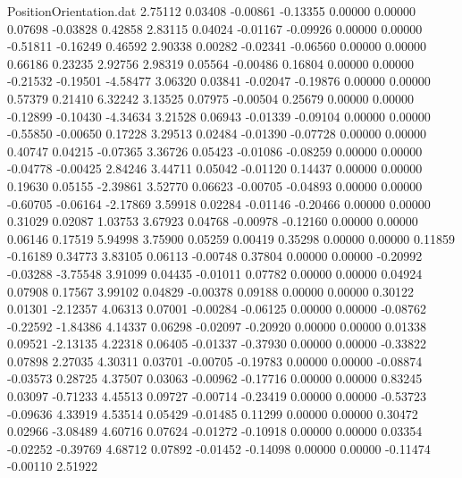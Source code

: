 \begin{filecontents}{PositionOrientation.dat}
   2.75112    0.03408   -0.00861    -0.13355    0.00000    0.00000    0.07698   -0.03828    0.42858
   2.83115    0.04024   -0.01167    -0.09926    0.00000    0.00000   -0.51811   -0.16249    0.46592
   2.90338    0.00282   -0.02341    -0.06560    0.00000    0.00000    0.66186    0.23235    2.92756
   2.98319    0.05564   -0.00486     0.16804    0.00000    0.00000   -0.21532   -0.19501   -4.58477
   3.06320    0.03841   -0.02047    -0.19876    0.00000    0.00000    0.57379    0.21410    6.32242
   3.13525    0.07975   -0.00504     0.25679    0.00000    0.00000   -0.12899   -0.10430   -4.34634
   3.21528    0.06943   -0.01339    -0.09104    0.00000    0.00000   -0.55850   -0.00650    0.17228
   3.29513    0.02484   -0.01390    -0.07728    0.00000    0.00000    0.40747    0.04215   -0.07365
   3.36726    0.05423   -0.01086    -0.08259    0.00000    0.00000   -0.04778   -0.00425    2.84246
   3.44711    0.05042   -0.01120     0.14437    0.00000    0.00000    0.19630    0.05155   -2.39861
   3.52770    0.06623   -0.00705    -0.04893    0.00000    0.00000   -0.60705   -0.06164   -2.17869
   3.59918    0.02284   -0.01146    -0.20466    0.00000    0.00000    0.31029    0.02087    1.03753
   3.67923    0.04768   -0.00978    -0.12160    0.00000    0.00000    0.06146    0.17519    5.94998
   3.75900    0.05259    0.00419     0.35298    0.00000    0.00000    0.11859   -0.16189    0.34773
   3.83105    0.06113   -0.00748     0.37804    0.00000    0.00000   -0.20992   -0.03288   -3.75548
   3.91099    0.04435   -0.01011     0.07782    0.00000    0.00000    0.04924    0.07908    0.17567
   3.99102    0.04829   -0.00378     0.09188    0.00000    0.00000    0.30122    0.01301   -2.12357
   4.06313    0.07001   -0.00284    -0.06125    0.00000    0.00000   -0.08762   -0.22592   -1.84386
   4.14337    0.06298   -0.02097    -0.20920    0.00000    0.00000    0.01338    0.09521   -2.13135
   4.22318    0.06405   -0.01337    -0.37930    0.00000    0.00000   -0.33822    0.07898    2.27035
   4.30311    0.03701   -0.00705    -0.19783    0.00000    0.00000   -0.08874   -0.03573    0.28725
   4.37507    0.03063   -0.00962    -0.17716    0.00000    0.00000    0.83245    0.03097   -0.71233
   4.45513    0.09727   -0.00714    -0.23419    0.00000    0.00000   -0.53723   -0.09636    4.33919
   4.53514    0.05429   -0.01485     0.11299    0.00000    0.00000    0.30472    0.02966   -3.08489
   4.60716    0.07624   -0.01272    -0.10918    0.00000    0.00000    0.03354   -0.02252   -0.39769
   4.68712    0.07892   -0.01452    -0.14098    0.00000    0.00000   -0.11474   -0.00110    2.51922

\end{filecontents}

